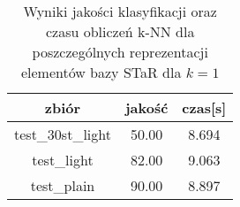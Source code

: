 \documentclass{classrepshort}
\begin{document}
\begin{table}[h!]
  \centering
  \caption{Wyniki jakości klasyfikacji oraz czasu obliczeń k-NN dla poszczególnych reprezentacji elementów bazy STaR dla $k=1$}
  \label{tab:tab1}
  \begin{tabular}{|c|c|c|}
    \hline
	zbiór & jakość & czas[s]\\
    \hline
    test\_30st\_light & 50.00 & 8.694\\
    \hline
	test\_light & 82.00 & 9.063\\
	\hline
	test\_plain & 90.00 & 8.897\\
	\hline
  \end{tabular}
\end{table}
\end{document}
